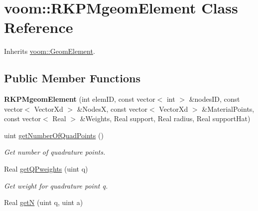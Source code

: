 \hypertarget{classvoom_1_1_r_k_p_mgeom_element}{
\section{voom::RKPMgeomElement Class Reference}
\label{classvoom_1_1_r_k_p_mgeom_element}
}


Inherits \hyperlink{classvoom_1_1_geom_element}{voom::GeomElement}.\subsection*{Public Member Functions}
\begin{DoxyCompactItemize}
\item 
\hypertarget{classvoom_1_1_r_k_p_mgeom_element_a585f05d4a858d32f5f8661aad94d9768}{
{\bfseries RKPMgeomElement} (int elemID, const vector$<$ int $>$ \&nodesID, const vector$<$ VectorXd $>$ \&NodesX, const vector$<$ VectorXd $>$ \&MaterialPoints, const vector$<$ Real $>$ \&Weights, Real support, Real radius, Real supportHat)}
\label{classvoom_1_1_r_k_p_mgeom_element_a585f05d4a858d32f5f8661aad94d9768}

\item 
\hypertarget{classvoom_1_1_r_k_p_mgeom_element_a2c218f8760eca93f764af3d845ad25d3}{
uint \hyperlink{classvoom_1_1_r_k_p_mgeom_element_a2c218f8760eca93f764af3d845ad25d3}{getNumberOfQuadPoints} ()}
\label{classvoom_1_1_r_k_p_mgeom_element_a2c218f8760eca93f764af3d845ad25d3}

\begin{DoxyCompactList}\small\item\em Get number of quadrature points. \item\end{DoxyCompactList}\item 
\hypertarget{classvoom_1_1_r_k_p_mgeom_element_a73e86aa9b2221abe831eaa49e9e6b09a}{
Real \hyperlink{classvoom_1_1_r_k_p_mgeom_element_a73e86aa9b2221abe831eaa49e9e6b09a}{getQPweights} (uint q)}
\label{classvoom_1_1_r_k_p_mgeom_element_a73e86aa9b2221abe831eaa49e9e6b09a}

\begin{DoxyCompactList}\small\item\em Get weight for quadrature point q. \item\end{DoxyCompactList}\item 
\hypertarget{classvoom_1_1_r_k_p_mgeom_element_a8b855415e0d8e86696ac6d717e51af55}{
Real \hyperlink{classvoom_1_1_r_k_p_mgeom_element_a8b855415e0d8e86696ac6d717e51af55}{getN} (uint q, uint a)}
\label{classvoom_1_1_r_k_p_mgeom_element_a8b855415e0d8e86696ac6d717e51af55}


\end{DoxyCompactItemize}
